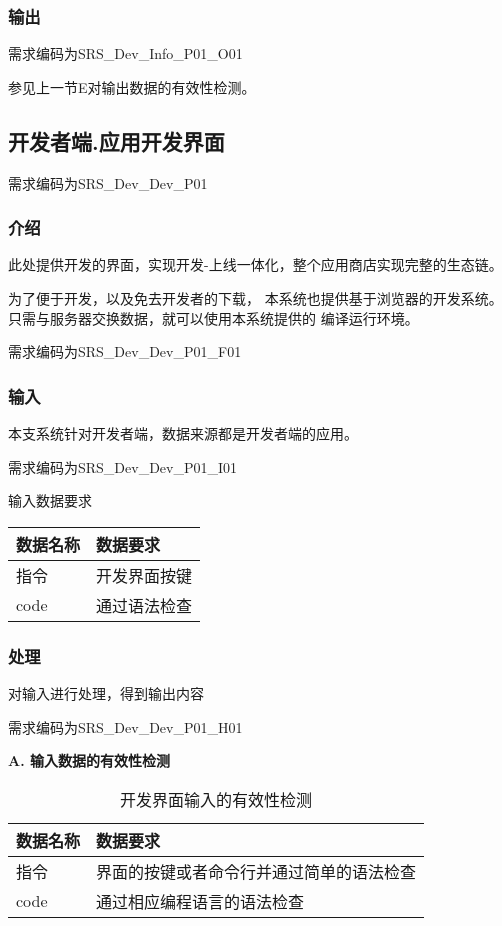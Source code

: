 \subsubsection{输出}
需求编码为SRS\_Dev\_Info\_P01\_O01

参见上一节E对输出数据的有效性检测。


{\color{red}
\subsection{开发者端.应用开发界面}

需求编码为SRS\_Dev\_Dev\_P01
\subsubsection{介绍}
此处提供开发的界面，实现开发-上线一体化，整个应用商店实现完整的生态链。 

为了便于开发，以及免去开发者的下载，
本系统也提供基于浏览器的开发系统。只需与服务器交换数据，就可以使用本系统提供的
编译运行环境。

需求编码为SRS\_Dev\_Dev\_P01\_F01
\subsubsection{输入}

本支系统针对开发者端，数据来源都是开发者端的应用。

需求编码为SRS\_Dev\_Dev\_P01\_I01

输入数据要求

\begin{longtable}[]{@{}ll@{}}
\toprule
数据名称 & 数据要求\tabularnewline
\midrule
\endhead
指令 & 开发界面按键\tabularnewline
code & 通过语法检查  \tabularnewline
\bottomrule
\end{longtable}

\subsubsection{处理}

对输入进行处理，得到输出内容

需求编码为SRS\_Dev\_Dev\_P01\_H01

\textbf{A. 输入数据的有效性检测}

\begin{longtable}[]{@{}ll@{}}
\caption{开发界面输入的有效性检测}\label{tab:dev_dev_input_valid}\\
\toprule
数据名称 & 数据要求\tabularnewline
\midrule
\endhead
指令 & 界面的按键或者命令行并通过简单的语法检查\tabularnewline
code & 通过相应编程语言的语法检查  \tabularnewline
\bottomrule
\end{longtable}

}
